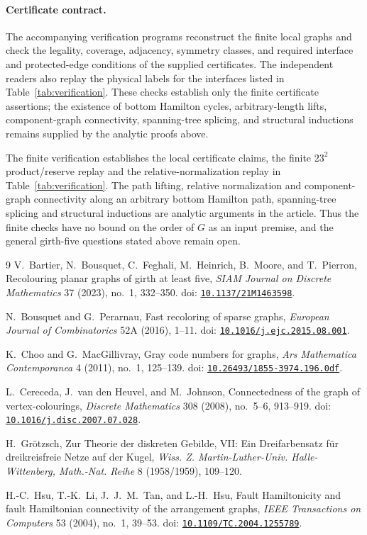 \documentclass[11pt]{article}
\newcommand{\doi}[1]{doi: \href{https://doi.org/#1}{\nolinkurl{#1}}}
\theoremstyle{remark}
\numberwithin{equation}{section}
\numberwithin{table}{section}
\begin{document}
\paragraph{Certificate contract.}
The accompanying verification programs reconstruct the finite local graphs
and check the legality, coverage, adjacency, symmetry classes, and required
interface and protected-edge conditions of the supplied certificates.  The
independent readers also replay the physical labels for the interfaces listed
in Table~\ref{tab:verification}.  These checks establish only the finite
certificate assertions; the existence of bottom Hamilton cycles,
arbitrary-length lifts, component-graph connectivity, spanning-tree
splicing, and structural inductions remains supplied by the analytic proofs
above.

The finite verification establishes the local certificate claims, the
finite $23^2$ product/reserve replay and the relative-normalization
replay in Table~\ref{tab:verification}.
The path lifting, relative normalization and component-graph
connectivity along an arbitrary bottom Hamilton path, spanning-tree splicing and structural inductions are
analytic arguments in the article. Thus the finite checks have no bound
on the order of $G$ as an input premise, and the general girth-five
questions stated above remain open.

\begin{thebibliography}{9}
V.~Bartier, N.~Bousquet, C.~Feghali, M.~Heinrich, B.~Moore, and T.~Pierron,
\newblock Recolouring planar graphs of girth at least five,
\newblock \emph{SIAM Journal on Discrete Mathematics} 37 (2023), no.~1, 332--350.
\newblock \doi{10.1137/21M1463598}.

N.~Bousquet and G.~Perarnau,
\newblock Fast recoloring of sparse graphs,
\newblock \emph{European Journal of Combinatorics} 52A (2016), 1--11.
\newblock \doi{10.1016/j.ejc.2015.08.001}.

K.~Choo and G.~MacGillivray,
\newblock Gray code numbers for graphs,
\newblock \emph{Ars Mathematica Contemporanea} 4 (2011), no.~1, 125--139.
\newblock \doi{10.26493/1855-3974.196.0df}.

L.~Cereceda, J.~van den Heuvel, and M.~Johnson,
\newblock Connectedness of the graph of vertex-colourings,
\newblock \emph{Discrete Mathematics} 308 (2008), no.~5--6, 913--919.
\newblock \doi{10.1016/j.disc.2007.07.028}.

H.~Gr\"otzsch,
\newblock Zur Theorie der diskreten Gebilde, VII: Ein Dreifarbensatz f\"ur dreikreisfreie Netze auf der Kugel,
\newblock \emph{Wiss. Z. Martin-Luther-Univ. Halle-Wittenberg, Math.-Nat. Reihe} 8 (1958/1959), 109--120.

H.-C.~Hsu, T.-K.~Li, J.~J.~M.~Tan, and L.-H.~Hsu,
\newblock Fault Hamiltonicity and fault Hamiltonian connectivity of the arrangement graphs,
\newblock \emph{IEEE Transactions on Computers} 53 (2004), no.~1, 39--53.
\newblock \doi{10.1109/TC.2004.1255789}.

\end{thebibliography}
\end{document}
